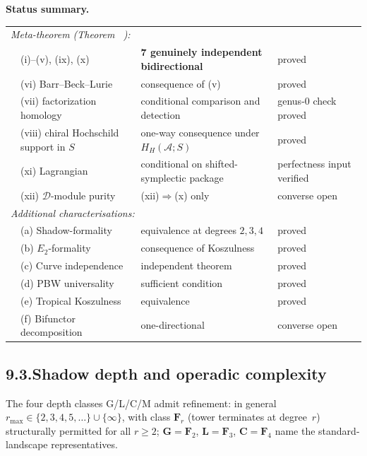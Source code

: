 \documentclass[11pt]{report}
\makeatletter
\theoremstyle{definition}
\theoremstyle{remark}
\providecommand{\cA}{\mathcal{A}}
\numberwithin{equation}{section}
\let\svy@oldref\ref
\renewcommand{\ref}[1]{%
 \@ifundefined{r@#1}{\textit{full monograph}}{\svy@oldref{#1}}%
}
\makeatother
\begin{document}
\medskip
\noindent\textbf{Status summary.}
\begin{center}
\renewcommand{\arraystretch}{1.15}
\begin{tabular}{clll}
\multicolumn{4}{l}{\emph{Meta-theorem (Theorem~\ref{thm:koszul-equivalences-meta}):}}\\[1pt]
& (i)--(v), (ix), (x) & \textbf{7 genuinely independent bidirectional} & proved\\
& (vi) Barr--Beck--Lurie & consequence of (v) & proved\\
& (vii) factorization homology & conditional comparison and detection & genus-$0$ check proved\\
& (viii) chiral Hochschild support in $S$ &
one-way consequence under $H_H(\cA;S)$ & proved\\
& (xi) Lagrangian & conditional on shifted-symplectic package & perfectness input verified\\
& (xii) $\mathcal D$-module purity & (xii)$\Rightarrow$(x) only & converse open\\[3pt]
\multicolumn{4}{l}{\emph{Additional characterisations:}}\\[1pt]
& (a) Shadow-formality & equivalence at degrees $2,3,4$ & proved\\
& (b) $E_2$-formality & consequence of Koszulness & proved\\
& (c) Curve independence & independent theorem & proved\\
& (d) PBW universality & sufficient condition & proved\\
& (e) Tropical Koszulness & equivalence & proved\\
& (f) Bifunctor decomposition & one-directional & converse open
\end{tabular}
\end{center}

\subsection*{9.3.\enspace Shadow depth and operadic complexity}

The four depth classes G/L/C/M admit refinement: in general
$r_{\max}\in\{2,3,4,5,\ldots\}\cup\{\infty\}$, with class $\mathbf F_r$
(tower terminates at degree~$r$) structurally permitted for all
$r\ge 2$; $\mathbf G=\mathbf F_2$, $\mathbf L=\mathbf F_3$,
$\mathbf C=\mathbf F_4$ name the standard-landscape representatives.
\end{document}
